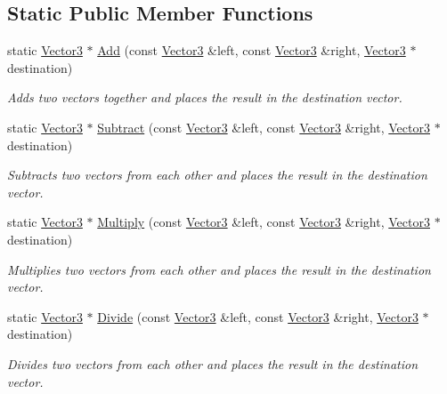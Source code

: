 \subsection*{Static Public Member Functions}
\begin{DoxyCompactItemize}
\item 
static \hyperlink{class_flounder_1_1_vector3}{Vector3} $\ast$ \hyperlink{class_flounder_1_1_vector3_acdac5405a300ea182f63e782edfb9ae8}{Add} (const \hyperlink{class_flounder_1_1_vector3}{Vector3} \&left, const \hyperlink{class_flounder_1_1_vector3}{Vector3} \&right, \hyperlink{class_flounder_1_1_vector3}{Vector3} $\ast$destination)
\begin{DoxyCompactList}\small\item\em Adds two vectors together and places the result in the destination vector. \end{DoxyCompactList}\item 
static \hyperlink{class_flounder_1_1_vector3}{Vector3} $\ast$ \hyperlink{class_flounder_1_1_vector3_a19155a52aa2a74a6c117ce3d2da38221}{Subtract} (const \hyperlink{class_flounder_1_1_vector3}{Vector3} \&left, const \hyperlink{class_flounder_1_1_vector3}{Vector3} \&right, \hyperlink{class_flounder_1_1_vector3}{Vector3} $\ast$destination)
\begin{DoxyCompactList}\small\item\em Subtracts two vectors from each other and places the result in the destination vector. \end{DoxyCompactList}\item 
static \hyperlink{class_flounder_1_1_vector3}{Vector3} $\ast$ \hyperlink{class_flounder_1_1_vector3_a0b07cb4db09a3bfe9f064a809d4c1091}{Multiply} (const \hyperlink{class_flounder_1_1_vector3}{Vector3} \&left, const \hyperlink{class_flounder_1_1_vector3}{Vector3} \&right, \hyperlink{class_flounder_1_1_vector3}{Vector3} $\ast$destination)
\begin{DoxyCompactList}\small\item\em Multiplies two vectors from each other and places the result in the destination vector. \end{DoxyCompactList}\item 
static \hyperlink{class_flounder_1_1_vector3}{Vector3} $\ast$ \hyperlink{class_flounder_1_1_vector3_a20e148b6df610f92e3732cd83d58c389}{Divide} (const \hyperlink{class_flounder_1_1_vector3}{Vector3} \&left, const \hyperlink{class_flounder_1_1_vector3}{Vector3} \&right, \hyperlink{class_flounder_1_1_vector3}{Vector3} $\ast$destination)
\begin{DoxyCompactList}\small\item\em Divides two vectors from each other and places the result in the destination vector. \end{DoxyCompactList}\item 

\end{DoxyCompactItemize}
